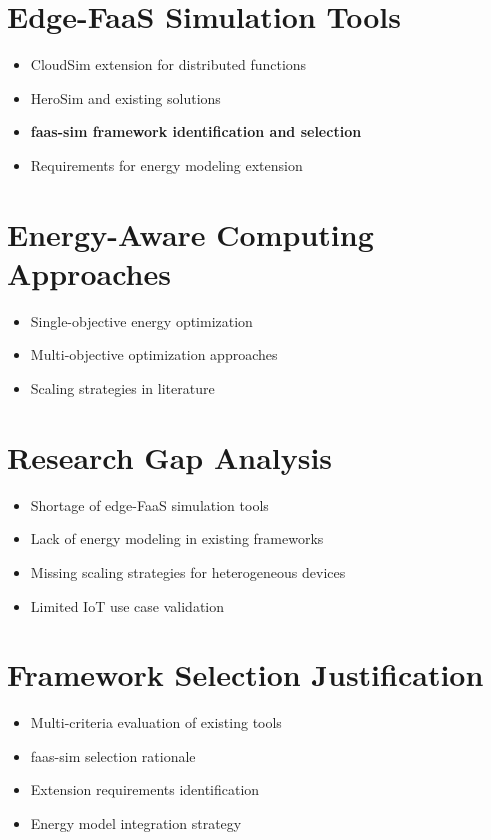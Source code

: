 \documentclass[12pt,a4paper]{report}
\begin{document}
\section{Edge-FaaS Simulation Tools}
\begin{itemize}[leftmargin=1cm]
    \item CloudSim extension for distributed functions
    \item HeroSim and existing solutions
    \item \textbf{faas-sim framework identification and selection}
    \item Requirements for energy modeling extension
\end{itemize}

\section{Energy-Aware Computing Approaches}
\begin{itemize}[leftmargin=1cm]
    \item Single-objective energy optimization
    \item Multi-objective optimization approaches
    \item Scaling strategies in literature
\end{itemize}

\section{Research Gap Analysis}
\begin{itemize}[leftmargin=1cm]
    \item Shortage of edge-FaaS simulation tools
    \item Lack of energy modeling in existing frameworks
    \item Missing scaling strategies for heterogeneous devices
    \item Limited IoT use case validation
\end{itemize}

\section{Framework Selection Justification}
\begin{itemize}[leftmargin=1cm]
    \item Multi-criteria evaluation of existing tools
    \item faas-sim selection rationale
    \item Extension requirements identification
    \item Energy model integration strategy
\end{itemize}
\end{document}
